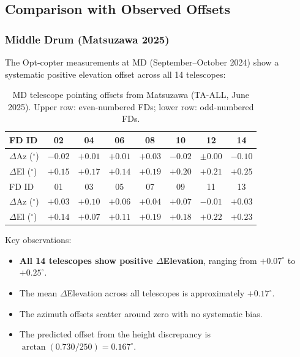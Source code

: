 \documentclass[11pt,letterpaper]{article}
\newcommand{\degree}{^\circ}
\begin{document}
\subsection{Comparison with Observed Offsets}

\subsubsection{Middle Drum (Matsuzawa 2025)}

The Opt-copter measurements at MD (September--October 2024) show a systematic positive elevation offset across all 14 telescopes:

\begin{table}[H]
\centering
\caption{MD telescope pointing offsets from Matsuzawa (TA-ALL, June 2025). Upper row: even-numbered FDs; lower row: odd-numbered FDs.}
\label{tab:md_offsets}
\smallskip
\begin{tabular}{@{}lccccccc@{}}
\toprule
FD ID & 02 & 04 & 06 & 08 & 10 & 12 & 14 \\
\midrule
$\Delta$Az ($\degree$) & $-0.02$ & $+0.01$ & $+0.01$ & $+0.03$ & $-0.02$ & $\pm 0.00$ & $-0.10$ \\
$\Delta$El ($\degree$) & $+0.15$ & $+0.17$ & $+0.14$ & $+0.19$ & $+0.20$ & $+0.21$ & $+0.25$ \\
\midrule
FD ID & 01 & 03 & 05 & 07 & 09 & 11 & 13 \\
\midrule
$\Delta$Az ($\degree$) & $+0.03$ & $+0.10$ & $+0.06$ & $+0.04$ & $+0.07$ & $-0.01$ & $+0.03$ \\
$\Delta$El ($\degree$) & $+0.14$ & $+0.07$ & $+0.11$ & $+0.19$ & $+0.18$ & $+0.22$ & $+0.23$ \\
\bottomrule
\end{tabular}
\end{table}

\noindent Key observations:

\begin{itemize}[nosep]
\item \textbf{All 14 telescopes show positive $\Delta$Elevation}, ranging from $+0.07\degree$ to $+0.25\degree$.
\item The mean $\Delta$Elevation across all telescopes is approximately $+0.17\degree$.
\item The azimuth offsets scatter around zero with no systematic bias.
\item The predicted offset from the height discrepancy is $\arctan(0.730/250) = 0.167\degree$.
\end{itemize}
\end{document}
